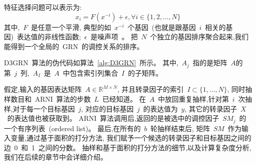 特征选择问题可以表示为:
\begin{equation}
\label{eq:fs}
x_i =  F(x^{-i}) + \epsilon , \forall i \in \{1,2,\ldots,N\}
\end{equation}
其中,~$F$~是任意一个平滑, 典型的如~$x^{-i}$~个基因~(也就是跟基因~$i$~相关的基因)~表达值的非线性函数;~$\epsilon$~是噪声项~\cite{huynh2010inferring,Haury2012}。
把~$N$~个独立的基因排序聚合起来,我们能得到一个全局的~GRN~的调控关系的排序。


D3GRN~算法的伪代码如算法~\ref{alg:D3GRN}~所示。
其中,~$A_j$~指的是矩阵~$A$的第~$j$~列,~$A_I$~是~$A$~中包含索引列集合~$I$~的子矩阵。

假定,输入的基因表达矩阵~$A \in \mathbb{R}^{M \times N}$, 
并且转录因子的索引~$I \subset \{1,\ldots,N\}$, 
同时抽样数目和~ARNI~算法的步数~$L$~已经知道。
在~$A$~中放回重复抽样,针对第~$i$~次抽样,对于每一个目标基因~$j$, 
对应的目标基因~$j$~的表达值为~$y$, 
其它的转录因子~$X$~的表达值也被获取到。
ARNI~算法调用后,返回的是被选中的调控因子~$SM_j$~的一个有序列表~(ordered list)。
最后,在所有的~$b$~轮抽样结束后,
矩阵~$SM$~作为输入变量,通过基于面积的打分方法,
我们赋予一个候选的转录因子和目标基因之间的边~0~和~1~之间的分数。
抽样和基于面积的打分方法的细节,以及计算复杂度分析,我们在后续的章节中会详细介绍。
 
